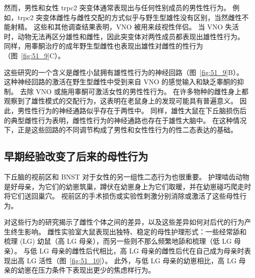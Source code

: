 然而，男性和女性 trpc2 突变体通常表现出与任何性别成员的男性性行为。
例如，trpc2 突变体雌性与雌性交配的方式似乎与野生型雄性没有区别，当然雌性不能射精。
这些和其他调查结果表明，VNO 被用来歧视性伴侣。
当 VNO 失活时，动物无法再区分雄性和雌性，因此突变体对两性成员都表现出雄性性行为。
同样，用睾酮治疗的成年野生型雌性也表现出雄性对雌性的性行为（图~\ref{fig:51_9}C）。


这些研究的一个含义是雌性小鼠拥有雄性性行为的神经回路（图~\ref{fig:51_9}B）。
这种神经回路的激活在野生型雌性中受到来自 VNO 的感觉输入和缺乏睾酮的抑制。
去除 VNO 或施用睾酮可激活女性的男性性行为。
在许多物种的雌性身上都观察到了雄性模式的交配行为，这表明在老鼠身上的发现可能具有普遍意义。
因此，男性性行为的神经通路似乎存在于两性中。
同样，雄性大鼠在下丘脑损伤后的典型雌性行为表明，雌性性行为的神经通路也存在于雄性大脑中。
在这种情况下，正是这些回路的不同调节构成了男性和女性性行为的性二态表达的基础。



\subsection{早期经验改变了后来的母性行为}

下丘脑的视前区和 BNST 对于女性的另一组性二态行为也很重要。
护理啮齿动物是好母亲，为它们的幼崽筑巢，蹲伏在幼崽身上为它们取暖，并在幼崽碰巧爬走时将它们送回巢穴。
视前区的手术损伤或实验性刺激分别消除或激活了这些母性行为。


对这些行为的研究揭示了雌性个体之间的差异，以及这些差异如何对后代的行为产生终生影响。
雌性实验室大鼠表现出独特、稳定的母性护理形式：一些经常舔和梳理 (LG) 幼鼠（高 LG 母亲），而另一些则不那么频繁地舔和梳理（低 LG 母亲）。
与低 LG 母亲的雌性后代相比，高 LG 母亲的雌性后代在自己成为母亲时表现出高 LG 活性（图~\ref{fig:51_10}）。
此外，与低 LG 母亲的幼崽相比，高 LG 母亲的幼崽在压力条件下表现出更少的焦虑样行为。


